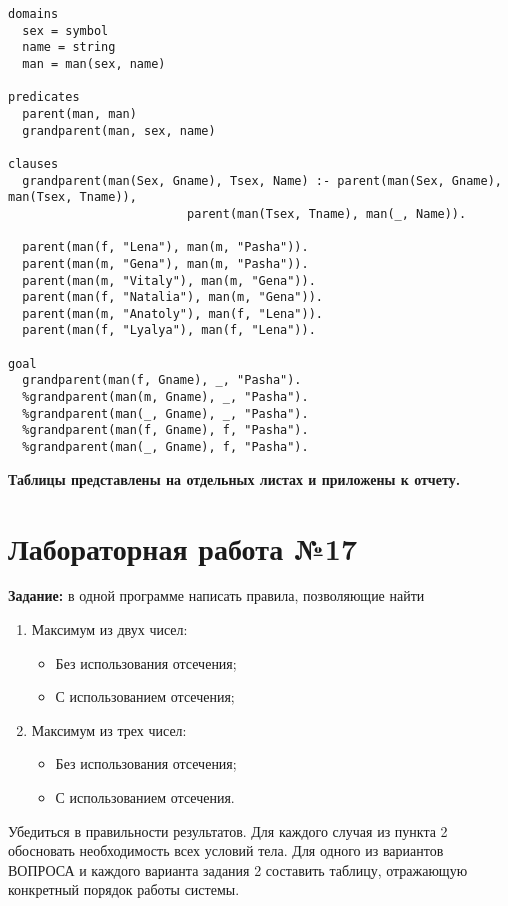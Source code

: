 \begin{lstlisting}
domains
  sex = symbol
  name = string
  man = man(sex, name)
  
predicates
  parent(man, man)
  grandparent(man, sex, name)
  
clauses
  grandparent(man(Sex, Gname), Tsex, Name) :- parent(man(Sex, Gname), man(Tsex, Tname)),
                         parent(man(Tsex, Tname), man(_, Name)).

  parent(man(f, "Lena"), man(m, "Pasha")).
  parent(man(m, "Gena"), man(m, "Pasha")).
  parent(man(m, "Vitaly"), man(m, "Gena")).
  parent(man(f, "Natalia"), man(m, "Gena")).
  parent(man(m, "Anatoly"), man(f, "Lena")).
  parent(man(f, "Lyalya"), man(f, "Lena")).

goal
  grandparent(man(f, Gname), _, "Pasha").
  %grandparent(man(m, Gname), _, "Pasha").
  %grandparent(man(_, Gname), _, "Pasha").
  %grandparent(man(f, Gname), f, "Pasha").
  %grandparent(man(_, Gname), f, "Pasha").
\end{lstlisting}

\textbf{Таблицы представлены на отдельных листах и приложены к отчету.}

\chapter{Лабораторная работа №17}


\textbf{Задание:} в одной программе написать правила, позволяющие найти
\begin{enumerate}
    \item Максимум из двух чисел:
    \begin{itemize}
        \item Без использования отсечения;
        \item С использованием отсечения;
    \end{itemize}
    \item Максимум из трех чисел:
    \begin{itemize}
        \item Без использования отсечения;
        \item С использованием отсечения.
    \end{itemize}
\end{enumerate}

Убедиться в правильности результатов. Для каждого случая из пункта 2 обосновать необходимость всех условий тела. Для одного из вариантов ВОПРОСА и каждого варианта задания 2 составить таблицу, отражающую конкретный порядок работы системы.

